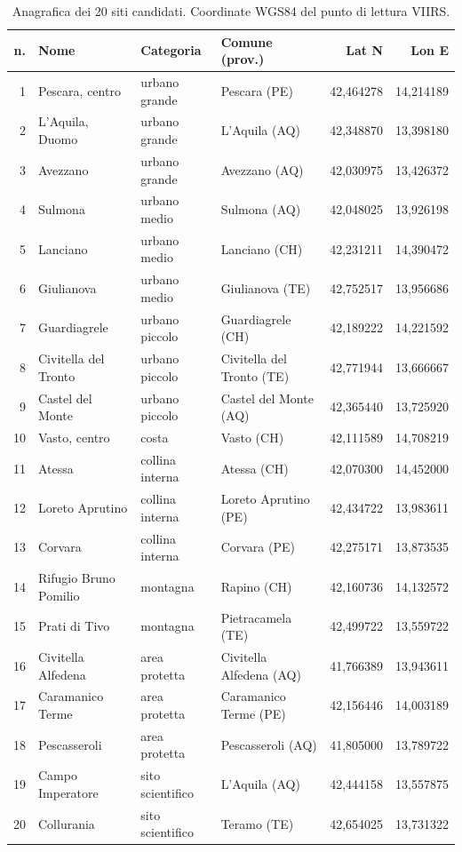 \documentclass[11pt,a4paper]{report}
\begin{document}
\begin{table}[ht!]
\centering
\renewcommand{\arraystretch}{1.5}
\setlength{\tabcolsep}{3.4pt}
\small

\begin{tabular}{@{}r l l l r r@{}}
\toprule
n. & Nome & Categoria & Comune (prov.) & Lat N & Lon E \\
\midrule
1 & Pescara, centro & urbano grande & Pescara (PE) & 42,464278 & 14,214189 \\
2 & L'Aquila, Duomo & urbano grande & L'Aquila (AQ) & 42,348870 & 13,398180 \\
3 & Avezzano & urbano grande & Avezzano (AQ) & 42,030975 & 13,426372 \\
4 & Sulmona & urbano medio & Sulmona (AQ) & 42,048025 & 13,926198 \\
5 & Lanciano & urbano medio & Lanciano (CH) & 42,231211 & 14,390472 \\
6 & Giulianova & urbano medio & Giulianova (TE) & 42,752517 & 13,956686 \\
7 & Guardiagrele & urbano piccolo & Guardiagrele (CH) & 42,189222 & 14,221592 \\
8 & Civitella del Tronto & urbano piccolo & Civitella del Tronto (TE) & 42,771944 & 13,666667 \\
9 & Castel del Monte & urbano piccolo & Castel del Monte (AQ) & 42,365440 & 13,725920 \\
10 & Vasto, centro & costa & Vasto (CH) & 42,111589 & 14,708219 \\
11 & Atessa & collina interna & Atessa (CH) & 42,070300 & 14,452000 \\
12 & Loreto Aprutino & collina interna & Loreto Aprutino (PE) & 42,434722 & 13,983611 \\
13 & Corvara & collina interna & Corvara (PE) & 42,275171 & 13,873535 \\
14 & Rifugio Bruno Pomilio & montagna & Rapino (CH) & 42,160736 & 14,132572 \\
15 & Prati di Tivo & montagna & Pietracamela (TE) & 42,499722 & 13,559722 \\
16 & Civitella Alfedena & area protetta & Civitella Alfedena (AQ) & 41,766389 & 13,943611 \\
17 & Caramanico Terme & area protetta & Caramanico Terme (PE) & 42,156446 & 14,003189 \\
18 & Pescasseroli & area protetta & Pescasseroli (AQ) & 41,805000 & 13,789722 \\
19 & Campo Imperatore & sito scientifico & L'Aquila (AQ) & 42,444158 & 13,557875 \\
20 & Collurania & sito scientifico & Teramo (TE) & 42,654025 & 13,731322 \\
\bottomrule
\end{tabular}

\caption{Anagrafica dei 20 siti candidati. Coordinate WGS84 del punto di lettura VIIRS.}
\label{tab:anagrafica}
\end{table}
\end{document}
